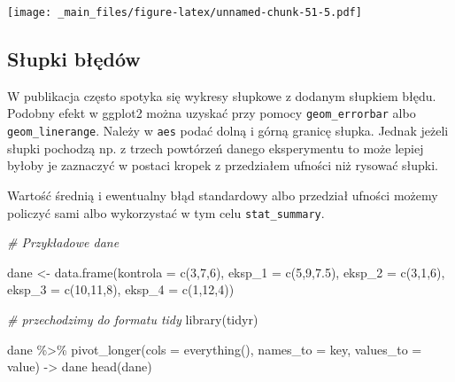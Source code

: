 \documentclass[
]{book}
\newenvironment{Shaded}{\begin{snugshade}}{\end{snugshade}}
\newcommand{\AttributeTok}[1]{\textcolor[rgb]{0.77,0.63,0.00}{#1}}
\newcommand{\CommentTok}[1]{\textcolor[rgb]{0.56,0.35,0.01}{\textit{#1}}}
\newcommand{\DecValTok}[1]{\textcolor[rgb]{0.00,0.00,0.81}{#1}}
\newcommand{\FloatTok}[1]{\textcolor[rgb]{0.00,0.00,0.81}{#1}}
\newcommand{\FunctionTok}[1]{\textcolor[rgb]{0.00,0.00,0.00}{#1}}
\newcommand{\NormalTok}[1]{#1}
\newcommand{\OtherTok}[1]{\textcolor[rgb]{0.56,0.35,0.01}{#1}}
\newcommand{\SpecialCharTok}[1]{\textcolor[rgb]{0.00,0.00,0.00}{#1}}
\newcommand{\StringTok}[1]{\textcolor[rgb]{0.31,0.60,0.02}{#1}}
\begin{document}
\texttt{[image: \_main\_files/figure-latex/unnamed-chunk-51-5.pdf]}

\hypertarget{sux142upki-bux142ux119duxf3w}{%
\subsection{Słupki błędów}\label{sux142upki-bux142ux119duxf3w}}

W publikacja często spotyka się wykresy słupkowe z dodanym słupkiem błędu. Podobny efekt w ggplot2 można uzyskać przy pomocy \texttt{geom\_errorbar} albo \texttt{geom\_linerange}. Należy w \texttt{aes} podać dolną i górną granicę słupka. Jednak jeżeli słupki pochodzą np. z trzech powtórzeń danego eksperymentu to może lepiej byłoby je zaznaczyć w postaci kropek z przedziałem ufności niż rysować słupki.

Wartość średnią i ewentualny błąd standardowy albo przedział ufności możemy policzyć sami albo wykorzystać w tym celu \texttt{stat\_summary}.

\begin{Shaded}
\begin{Highlighting}[]
\CommentTok{\# Przykładowe dane}

\NormalTok{dane }\OtherTok{\textless{}{-}} \FunctionTok{data.frame}\NormalTok{(}\AttributeTok{kontrola =} \FunctionTok{c}\NormalTok{(}\DecValTok{3}\NormalTok{,}\DecValTok{7}\NormalTok{,}\DecValTok{6}\NormalTok{), }\AttributeTok{eksp\_1 =} \FunctionTok{c}\NormalTok{(}\DecValTok{5}\NormalTok{,}\DecValTok{9}\NormalTok{,}\FloatTok{7.5}\NormalTok{), }\AttributeTok{eksp\_2 =} \FunctionTok{c}\NormalTok{(}\DecValTok{3}\NormalTok{,}\DecValTok{1}\NormalTok{,}\DecValTok{6}\NormalTok{), }\AttributeTok{eksp\_3 =} \FunctionTok{c}\NormalTok{(}\DecValTok{10}\NormalTok{,}\DecValTok{11}\NormalTok{,}\DecValTok{8}\NormalTok{), }\AttributeTok{eksp\_4 =} \FunctionTok{c}\NormalTok{(}\DecValTok{1}\NormalTok{,}\DecValTok{12}\NormalTok{,}\DecValTok{4}\NormalTok{))}

\CommentTok{\# przechodzimy do formatu tidy}
\FunctionTok{library}\NormalTok{(tidyr)}

\NormalTok{dane }\SpecialCharTok{\%\textgreater{}\%} \FunctionTok{pivot\_longer}\NormalTok{(}\AttributeTok{cols =} \FunctionTok{everything}\NormalTok{(), }\AttributeTok{names\_to =} \StringTok{\textquotesingle{}key\textquotesingle{}}\NormalTok{, }\AttributeTok{values\_to =} \StringTok{\textquotesingle{}value\textquotesingle{}}\NormalTok{) }\OtherTok{{-}\textgreater{}}\NormalTok{ dane}
\FunctionTok{head}\NormalTok{(dane)}
\end{Highlighting}
\end{Shaded}
\end{document}
